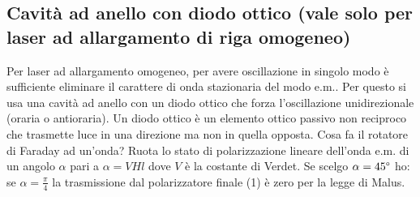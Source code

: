 \subsection{Cavità ad anello con diodo ottico (vale solo per laser ad allargamento di riga omogeneo)}
Per laser ad allargamento omogeneo, per avere oscillazione in singolo modo è sufficiente eliminare il carattere di onda stazionaria del modo e.m.. Per questo si usa una cavità ad anello con un diodo ottico che forza l'oscillazione unidirezionale (oraria o antioraria).
Un diodo ottico è un elemento ottico passivo non reciproco che trasmette luce in una direzione ma non in quella opposta.
Cosa fa il rotatore di Faraday ad un'onda?
Ruota lo stato di polarizzazione lineare dell'onda e.m. di un angolo $\alpha$ pari a $\alpha = VHl$ dove $V$ è la costante di Verdet.
Se scelgo $\alpha = 45 \degree$ ho:
se $\alpha = \frac{\pi}{4}$ la trasmissione dal polarizzatore finale (1) è zero per la legge di Malus.

